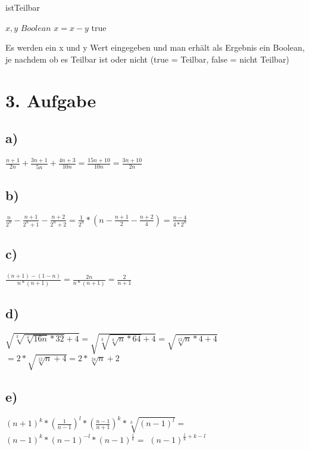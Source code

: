 \documentclass{article}
\begin{document}
    \begin{algorithm}
    \caption{istTeilbar}\label{alg:cap}
    \begin{algorithmic}
    \Require $x,y$
    \Ensure $Boolean$
            \State $x = x - y$
         {
        true} 
    \end{algorithmic}
    \end{algorithm}\newline
    Es werden ein x und y Wert eingegeben und man erhält als Ergebnis ein Boolean, je nachdem ob es Teilbar ist oder nicht (true = Teilbar, false = nicht Teilbar)
    

\section*{3. Aufgabe}

    

    \subsection*{a)} 
    $\frac{n+1}{2n} + \frac{3n+1}{5n} + \frac{4n+3}{10n} = \frac{15n+10}{10n} = \frac{3n+10}{2n}$
    \subsection*{b)}
    $\frac{n}{2^n} - \frac{n+1}{2^n+1} - \frac{n+2}{2^n+2} = \frac{1}{2^n} * (n - \frac{n+1}{2} - \frac{n+2}{4}) = \frac{n-4}{4*2^n}$
    \subsection*{c)}
    $\frac{(n+1)-(1-n)}{n*(n+1)} = \frac{2n}{n*(n+1)} = \frac{2}{n+1}$
    \subsection*{d)}
    $\sqrt{\sqrt[3]{\sqrt[4]{16n}*32}+4} = \sqrt{\sqrt[3]{\sqrt[4]{n}*64}+4} = \sqrt{\sqrt[12]{n}*4+4}$
    \newline
    $ = 2 * \sqrt{\sqrt[12]{n}+4} = 2 * \sqrt[24]{n}+2$
    \subsection*{e)}
    $(n+1)^k * (\frac{1}{n-1})^l * (\frac{n-1}{n+1})^k * \sqrt[k]{(n-1)^l} =$ \newline
    $(n-1)^k * (n-1)^{-l} * (n-1)^{\frac{l}{k}} =$ \newline
    $(n-1)^{\frac{l}{k} + k - l}$ \newpage
\end{document}
